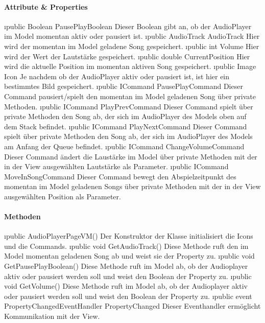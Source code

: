 \documentclass[../entwurf.tex]{subfiles}
\begin{document}
\paragraph{Attribute \& Properties}
\begin{itemize}
	\i{public Boolean PausePlayBoolean} Dieser Boolean gibt an, ob der AudioPlayer im Model momentan aktiv oder pausiert ist.
	\i{public AudioTrack AudioTrack} Hier wird der momentan im Model geladene Song gespeichert.
	\i{public int Volume} Hier wird der Wert der Lautstärke gespeichert.
	\i{public double CurrentPosition} Hier wird die aktuelle Position im momentan aktiven Song gespeichert.
	\i{public Image Icon} Je nachdem ob der AudioPlayer aktiv oder pausiert ist, ist hier ein bestimmtes Bild gespeichert.
	\i{public ICommand PausePlayCommand} Dieser Command pausiert/spielt den momentan im Model geladenen Song über private Methoden. 
	\i{public ICommand PlayPrevCommand} Dieser Command spielt über private Methoden den Song ab, der sich im AudioPlayer des Models oben auf dem Stack befindet. 
	\i{public ICommand PlayNextCommand} Dieser Command spielt über private Methoden den Song ab, der sich im AudioPlayer des Models am Anfang der Queue befindet. 
	\i{public ICommand ChangeVolumeCommand} Dieser Command ändert die Laustärke im Model über private Methoden mit der in der View ausgewählten Lautstärke als Parameter.
	\i{public ICommand MoveInSongCommand} Dieser Command bewegt den Abspielzeitpunkt des momentan im Model geladenen Songs über private Methoden mit der in der View ausgewählten Position als Parameter.
\end{itemize}
\paragraph{Methoden}
\begin{itemize}
	\i{public AudioPlayerPageVM()} Der Konstruktor der Klasse initialisiert die Icons und die Commands.
	\i{public void GetAudioTrack()} Diese Methode ruft den im Model momentan geladenen Song ab und weist sie der Property  zu.
	\i{public void GetPausePlayBoolean()} Diese Methode ruft im Model ab, ob der Audioplayer aktiv oder pausiert werden soll und weist den Boolean der Property  zu.
	\i{public void GetVolume()} Diese Methode ruft im Model ab, ob der Audioplayer aktiv oder pausiert werden soll und weist den Boolean der Property  zu.
	\i{public event PropertyChangedEventHandler PropertyChanged} Dieser Eventhandler ermöglicht Kommunikation mit der View.
\end{itemize}
\end{document}

